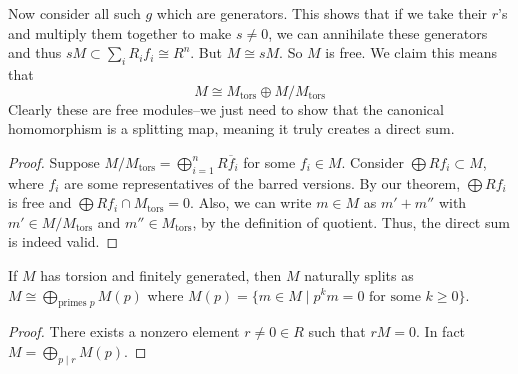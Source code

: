 Now consider all such $g$ which are generators. This shows that if we take their $r$'s and multiply them together to make $s \neq 0$,
we can annihilate these generators and thus $sM \subset \sum_i R_i f_i \cong R^n$. But $M \cong sM$. So $M$ is free.
We claim this means that \[ M \cong M_{\text{tors}} \oplus M/M_{\text{tors}} \]
Clearly these are free modules--we just need to show that the canonical homomorphism is a splitting map, meaning
it truly creates a direct sum.
\begin{proof}
    Suppose $M/M_{\text{tors}} = \bigoplus_{i = 1}^n R \overline{f}_i$ for some $f_i \in M$. Consider $\bigoplus R f_i \subset M$,
    where $f_i$ are some representatives of the barred versions.
    By our theorem, $\bigoplus R f_i$ is free and $\bigoplus R f_i \cap M_{\text{tors}} = 0$. Also, we can write $m \in M$ as $m' + m''$ with $m' \in M/M_{\text{tors}}$ and $m'' \in M_{\text{tors}}$,
    by the definition of quotient. Thus, the direct sum is indeed valid.
\end{proof}
\begin{theorem}
    If $M$ has torsion and finitely generated, then $M$ naturally splits as $M \cong \bigoplus_{\text{primes }p} M(p)$
    where $M(p) = \{m \in M \mid p^k m = 0 \text{ for some $k \geq 0$}\}$.
    \begin{proof}
        There exists a nonzero element $r \neq 0 \in R$ such that $rM = 0$. In fact $M = \bigoplus_{p \mid r} M(p)$.
    \end{proof}
\end{theorem}